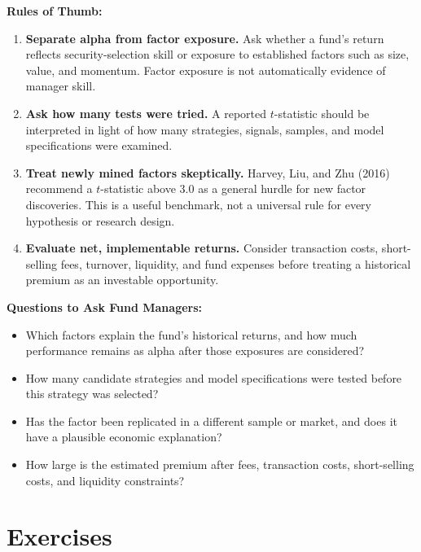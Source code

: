 \textbf{Rules of Thumb:}
\begin{enumerate}
  \item \textbf{Separate alpha from factor exposure.} Ask whether a fund's return reflects security-selection skill or exposure to established factors such as size, value, and momentum. Factor exposure is not automatically evidence of manager skill.
  \item \textbf{Ask how many tests were tried.} A reported $t$-statistic should be interpreted in light of how many strategies, signals, samples, and model specifications were examined.
  \item \textbf{Treat newly mined factors skeptically.} Harvey, Liu, and Zhu (2016) recommend a $t$-statistic above 3.0 as a general hurdle for new factor discoveries. This is a useful benchmark, not a universal rule for every hypothesis or research design.
  \item \textbf{Evaluate net, implementable returns.} Consider transaction costs, short-selling fees, turnover, liquidity, and fund expenses before treating a historical premium as an investable opportunity.
\end{enumerate}

\textbf{Questions to Ask Fund Managers:}
\begin{itemize}
  \item Which factors explain the fund's historical returns, and how much performance remains as alpha after those exposures are considered?
  \item How many candidate strategies and model specifications were tested before this strategy was selected?
  \item Has the factor been replicated in a different sample or market, and does it have a plausible economic explanation?
  \item How large is the estimated premium after fees, transaction costs, short-selling costs, and liquidity constraints?
\end{itemize}

\section*{Exercises}

